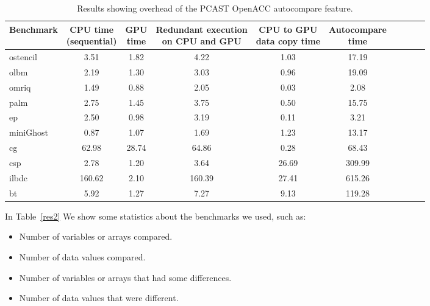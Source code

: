 \begin{table}
\begin{center}
\begin{tabular}{|l|c|c|c|c|c|c|c|c|c|}
\hline

Benchmark & \parbox[c]{1.9 cm}{\centering CPU time \\(sequential)} &  \parbox[c]{1 cm}{\centering GPU \\ time} & \parbox[c]{3.5 cm}{\centering Redundant execution \\ on CPU and GPU} & \parbox[c]{2.75 cm}{\centering CPU to GPU \\  data copy time} &  \parbox[c]{2 cm}{\centering Autocompare \\   time} \\



\hline

ostencil  & 3.51 & 1.82 & 4.22 & 1.03 & 17.19\\
olbm      & 2.19 & 1.30 & 3.03 & 0.96 & 19.09 \\
omriq     & 1.49 & 0.88 & 2.05 & 0.03 & 2.08\\
palm      & 2.75 & 1.45 & 3.75 & 0.50 & 15.75\\
ep        & 2.50 & 0.98 & 3.19 & 0.11 & 3.21\\
miniGhost & 0.87 & 1.07 & 1.69 & 1.23 & 13.17\\
cg        & 62.98 & 28.74 & 64.86 & 0.28 & 68.43\\
csp       & 2.78 & 1.20	& 3.64 & 26.69 & 309.99\\
ilbdc     & 160.62 & 2.10 & 160.39 & 27.41 & 615.26\\
bt        & 5.92 & 1.27 & 7.27 & 9.13 & 119.28\\

            
\hline
\end{tabular}
\end{center}
\caption{Results showing overhead of the PCAST OpenACC autocompare feature.}
\label{res1}
\end{table}


In Table~\ref{res2} 
We show some statistics about the benchmarks we used, such as:
\begin{itemize}
\item Number of variables or arrays compared.
\item Number of data values compared.
\item Number of variables or arrays that had some differences.
\item Number of data values that were different.
\end{itemize}




